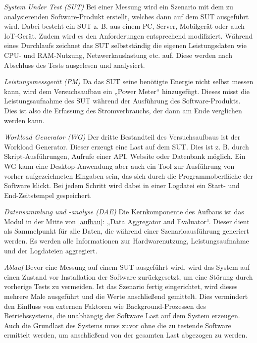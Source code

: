 \documentclass[utf8,biblatex]{lni}
\begin{document}
\textit{System Under Test (SUT)} \newline
Bei einer Messung wird ein Szenario mit dem zu analysierenden Software-Produkt erstellt, welches dann auf dem SUT ausgeführt wird. Dabei besteht ein SUT z. B. aus einem PC, Server, Mobilgerät oder auch IoT-Gerät. Zudem wird es den Anforderungen entsprechend modifiziert. Während eines Durchlaufs zeichnet das SUT selbstständig die eigenen Leistungsdaten wie CPU- und RAM-Nutzung, Netzwerkauslastung etc. auf. Diese werden nach Abschluss des Tests ausgelesen und analysiert.

\textit{Leistungsmessgerät (PM)} \newline
Da das SUT seine benötigte Energie nicht selbst messen kann, wird dem Versuchsaufbau ein „Power Meter“ hinzugefügt. Dieses misst die Leistungsaufnahme des SUT während der Ausführung des Software-Produkts. Dies ist also die Erfassung des Stromverbrauchs, der dann am Ende verglichen werden kann.

\textit{Workload Generator (WG)} \newline
Der dritte Bestandteil des Versuchsaufbaus ist der Workload Generator. Dieser erzeugt eine Last auf dem SUT. Dies ist z. B. durch Skript-Ausführungen, Aufrufe einer API, Website oder Datenbank möglich. Ein WG kann eine Desktop-Anwendung aber auch ein Tool zur Ausführung von vorher aufgezeichneten Eingaben sein, das sich durch die Programmoberfläche der Software klickt. Bei jedem Schritt wird dabei in einer Logdatei ein Start- und End-Zeitstempel gespeichert.

\textit{Datensammlung und -analyse (DAE)} \newline
Die Kernkomponente des Aufbaus ist das Modul in der Mitte von \autoref{aufbau}: „Data Aggregator and Evaluator“. Dieser dient als Sammelpunkt für alle Daten, die während einer Szenarioausführung generiert werden. Es werden alle Informationen zur Hardwarenutzung, Leistungsaufnahme und der Logdateien aggregiert.

\textit{Ablauf} \newline
Bevor eine Messung auf einem SUT ausgeführt wird, wird das System auf einen Zustand vor Installation der Software zurückgesetzt, um eine Störung durch vorherige Tests zu vermeiden. Ist das Szenario fertig eingerichtet, wird dieses mehrere Male ausgeführt und die Werte anschließend gemittelt. Dies vermindert den Einfluss von externen Faktoren wie Background-Prozessen des Betriebssystems, die unabhängig der Software Last auf dem System erzeugen. Auch die Grundlast des Systems muss zuvor ohne die zu testende Software ermittelt werden, um anschließend von der gesamten Last abgezogen zu werden. \cite{Kern18}
\end{document}
